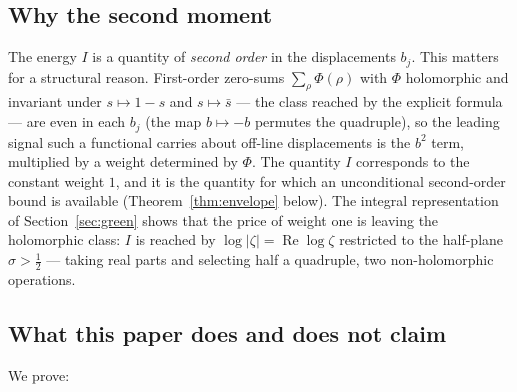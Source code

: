 \documentclass[11pt]{amsart}
\theoremstyle{plain}
\theoremstyle{definition}
\theoremstyle{remark}
\renewcommand{\Re}{\operatorname{Re}}
\begin{document}
\subsection{Why the second moment}

The energy $I$ is a quantity of \emph{second order} in the displacements $b_j$. This matters for a structural reason. First-order zero-sums $\sum_\rho \Phi(\rho)$ with $\Phi$ holomorphic and invariant under $s\mapsto1-s$ and $s\mapsto\bar s$ --- the class reached by the explicit formula --- are even in each $b_j$ (the map $b\mapsto-b$ permutes the quadruple), so the leading signal such a functional carries about off-line displacements is the $b^2$ term, multiplied by a weight determined by $\Phi$. The quantity $I$ corresponds to the constant weight $1$, and it is the quantity for which an unconditional second-order bound is available (Theorem~\ref{thm:envelope} below). The integral representation of Section~\ref{sec:green} shows that the price of weight one is leaving the holomorphic class: $I$ is reached by $\log|\zeta|=\Re\log\zeta$ restricted to the half-plane $\sigma>\tfrac12$ --- taking real parts and selecting half a quadruple, two non-holomorphic operations.

\subsection{What this paper does and does not claim}

We prove:
\end{document}
